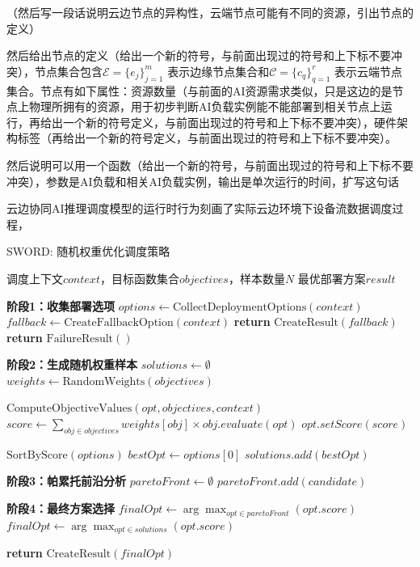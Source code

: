 （然后写一段话说明云边节点的异构性，云端节点可能有不同的资源，引出节点的定义）

然后给出节点的定义（给出一个新的符号，与前面出现过的符号和上下标不要冲突），节点集合包含$\mathcal{E} = \{e_j\}_{j=1}^m$ 表示边缘节点集合和$\mathcal{C} = \{c_q\}_{q=1}^r$ 表示云端节点集合。节点有如下属性：资源数量（与前面的AI资源需求类似，只是这边的是节点上物理所拥有的资源，用于初步判断AI负载实例能不能部署到相关节点上运行，再给出一个新的符号定义，与前面出现过的符号和上下标不要冲突），硬件架构标签（再给出一个新的符号定义，与前面出现过的符号和上下标不要冲突）。

然后说明可以用一个函数（给出一个新的符号，与前面出现过的符号和上下标不要冲突），参数是AI负载和相关AI负载实例，输出是单次运行的时间，扩写这句话


云边协同AI推理调度模型的运行时行为刻画了实际云边环境下设备流数据调度过程，




\begin{algorithm}
\caption{SWORD: 随机权重优化调度策略}
\label{alg:sword}
\begin{algorithmic}[1]
\REQUIRE 调度上下文$context$，目标函数集合$objectives$，样本数量$N$
\ENSURE 最优部署方案$result$

\STATE \textbf{阶段1：收集部署选项}
\STATE $options \leftarrow \text{CollectDeploymentOptions}(context)$
    \STATE $fallback \leftarrow \text{CreateFallbackOption}(context)$
        \STATE \textbf{return} $\text{CreateResult}(fallback)$
    \ELSE
        \STATE \textbf{return} $\text{FailureResult}()$
    \ENDIF
\ENDIF

\STATE \textbf{阶段2：生成随机权重样本}
\STATE $solutions \leftarrow \emptyset$
    \STATE {}
    \STATE $weights \leftarrow \text{RandomWeights}(objectives)$
    
    \STATE {}
        \STATE $\text{ComputeObjectiveValues}(opt, objectives, context)$
        \STATE $score \leftarrow \sum_{obj\in objectives}weights[obj] \times obj.evaluate(opt)$
        \STATE $opt.setScore(score)$
    \ENDFOR
    
    \STATE $\text{SortByScore}(options)$ 
    \STATE $bestOpt \leftarrow options[0]$
    \STATE $solutions.add(bestOpt)$
\ENDFOR

\STATE \textbf{阶段3：帕累托前沿分析}
\STATE $paretoFront \leftarrow \emptyset$
        \STATE $paretoFront.add(candidate)$
    \ENDIF
\ENDFOR

\STATE \textbf{阶段4：最终方案选择}
    \STATE $finalOpt \leftarrow \arg\max_{opt \in paretoFront}(opt.score)$
\ELSE
    \STATE $finalOpt \leftarrow \arg\max_{opt \in solutions}(opt.score)$
\ENDIF

\STATE \textbf{return} $\text{CreateResult}(finalOpt)$
\end{algorithmic}
\end{algorithm}

